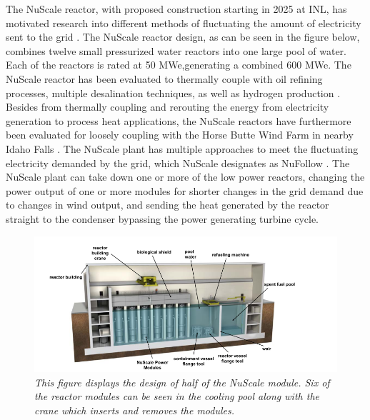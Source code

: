 \documentclass[12pt]{UIdahoMastersThesis}
\begin{document}
The NuScale reactor, with proposed construction starting in 2025 at INL, has motivated research into different methods of fluctuating the amount of electricity sent to the grid \cite{Ingersoll2014, Ingersoll2015, Ingersoll2016, Ingersoll2014_1}. The NuScale reactor design, as can be seen in the figure below, combines twelve small pressurized water reactors into one large pool of water.  Each of the reactors is rated at 50 MWe,generating a combined 600 MWe. The NuScale reactor has been evaluated to thermally couple with oil refining processes, multiple desalination techniques, as well as hydrogen production \cite{Ingersoll2014}. Besides from thermally coupling and rerouting the energy from electricity generation to process heat applications, the NuScale reactors have furthermore been evaluated for loosely coupling with the Horse Butte Wind Farm in nearby Idaho Falls \cite{Ingersoll2015}.  The NuScale plant has multiple approaches to meet the fluctuating electricity demanded by the grid, which NuScale designates as NuFollow \cite{Ingersoll2015}.  The NuScale plant can take down one or more of the low power reactors, changing the power output of one or more modules for shorter changes in the grid demand due to changes in wind output, and sending the heat generated by the reactor straight to the condenser bypassing the power generating turbine cycle.  
\begin{figure}[h!]
\includegraphics[width=\textwidth]{NuScale_cutaway.PNG}
\caption{\small \sl This figure displays the design of half of the NuScale module. Six of the reactor modules can be seen in the cooling pool along with the crane which inserts and removes the modules.}
\end{figure}
\end{document}
